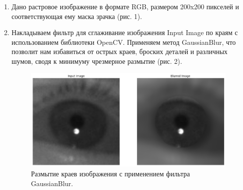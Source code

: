 \documentclass{article}
\begin{document}
\begin{enumerate}
\item Дано растровое изображение в формате RGB, размером 200x200 пикселей и соответствующая ему маска зрачка (рис. 1).
\item Накладываем фильтр для сглаживание изображения Input Image по краям с использованием библиотеки OpenCV. Применяем метод GaussianBlur, что позволит нам избавиться от острых краев, броских деталей и различных шумов, сводя к минимуму чрезмерное размытие (рис. 2).

\begin{figure}[h]
\centering
\includegraphics[width=0.8\linewidth]{blurred_image.png}
\caption{Размытие краев изображения с применением фильтра GaussianBlur.}
\label{fig:mpr}
\end{figure}


\end{enumerate}
\end{document}
